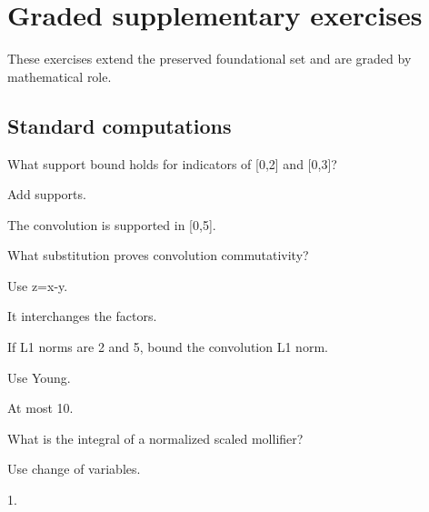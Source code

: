 \section{Graded supplementary exercises}
These exercises extend the preserved foundational set and are graded by mathematical role.

\subsection*{Standard computations}

\begin{exercise}\label{exr:iii10-expand-01}
What support bound holds for indicators of [0,2] and [0,3]?
\end{exercise}
\begin{hint}
Add supports.
\end{hint}
\begin{solution}
The convolution is supported in [0,5].
\end{solution}

\begin{exercise}[Commutativity]\label{exr:iii10-expand-02}
What substitution proves convolution commutativity?
\end{exercise}
\begin{hint}
Use z=x-y.
\end{hint}
\begin{solution}
It interchanges the factors.
\end{solution}

\begin{exercise}[Young L1]\label{exr:iii10-expand-03}
If L1 norms are 2 and 5, bound the convolution L1 norm.
\end{exercise}
\begin{hint}
Use Young.
\end{hint}
\begin{solution}
At most 10.
\end{solution}

\begin{exercise}\label{exr:iii10-expand-04}
What is the integral of a normalized scaled mollifier?
\end{exercise}
\begin{hint}
Use change of variables.
\end{hint}
\begin{solution}
1.
\end{solution}

